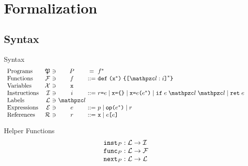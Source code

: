 \section{Formalization}

\subsection{Syntax}
Syntax
\[
  \begin{array}{lr@{~}c@{~}c@{~}c@{~}l}
    \text{Programs} & \progset &\ni& \prog &=& \func^*\\

    \text{Functions} & \funcset &\ni& \func &::=&
    \kwdef \; \kwrl \varx^* \kwrr \; \kwcl \kwsl \lab : \inst \kwsr^* \kwcr \\

    \text{Variables} & \varset &\ni& \varx\\

    \text{Instructions} & \instset &\ni& \inst &::=&
    \refer \kweq \expr \mid
    \varx \kweq \kwcl \kwcr \mid
    \varx \kweq \expr \kwrl \expr^* \kwrr \mid
    \kwif \; \expr \; \lab \; \lab \mid
    \kwret \; \expr\\

    \text{Labels} & \labset &\ni& \lab\\

    \text{Expressions} & \exprset &\ni& \expr &::=&
    \pval \mid
    \op \kwrl \expr^* \kwrr \mid
    \refer\\

    \text{References} & \referset &\ni& \refer &::=&
    \varx \mid \expr \kwsl \expr \kwsr\\
  \end{array}
\]

Helper Functions
\[
  \begin{array}{l}
    \getinst{\prog}: \labset \rightarrow \instset\\
    \getfunc{\prog}: \labset \rightarrow \funcset\\
    \getnext{\prog}: \labset \rightarrow \labset\\
  \end{array}
\]

